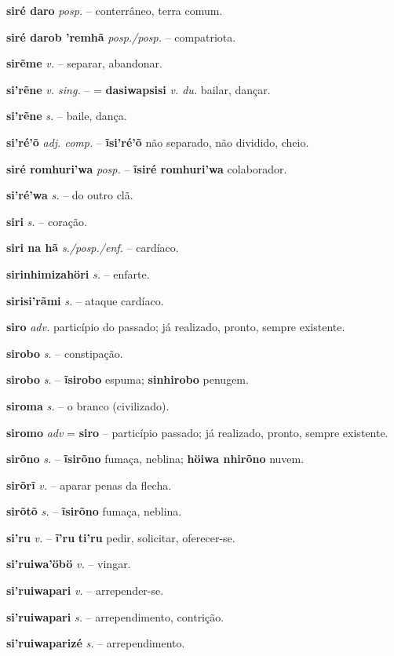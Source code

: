 \textbf{siré daro} \textit{posp.} -- conterrâneo, terra comum.

\textbf{siré darob 'remhã} \textit{posp./posp.} -- compatriota.

\textbf{sirẽme} \textit{v.} -- separar, abandonar.

\textbf{si'rẽne} \textit{v. sing.} -- = \textbf{dasiwapsisi} \textit{v. du.} bailar, dançar.

\textbf{si'rẽne} \textit{s.} -- baile, dança.

\textbf{si'ré'õ} \textit{adj. comp.} -- \textbf{ĩsi'ré'õ} não separado, não dividido, cheio.

\textbf{siré romhuri'wa} \textit{posp.} -- \textbf{ĩsiré romhuri'wa} colaborador.

\textbf{si'ré'wa} \textit{s.} -- do outro clã.

\textbf{siri} \textit{s.} -- coração.

\textbf{siri na hã} \textit{s./posp./enf.} -- cardíaco.

\textbf{sirinhimizahöri} \textit{s.} -- enfarte.

\textbf{sirisi'rãmi} \textit{s.} -- ataque cardíaco.

\textbf{siro} \textit{adv.} particípio do passado; já realizado, pronto, sempre existente.

\textbf{sirobo} \textit{s.} -- constipação.

\textbf{sirobo} \textit{s.} -- \textbf{ĩsirobo} espuma; \textbf{sinhirobo} penugem.

\textbf{siroma} \textit{s.} -- o branco (civilizado).

\textbf{siromo} \textit{adv} = \textbf{siro} -- particípio passado; já realizado, pronto, sempre existente.

\textbf{sirõno} \textit{s.} -- \textbf{ĩsirõno} fumaça, neblina; \textbf{höiwa nhirõno} nuvem.

\textbf{sirõrĩ} \textit{v.} -- aparar penas da flecha.

\textbf{sirõtõ} \textit{s.} -- \textbf{ĩsirõno} fumaça, neblina.

\textbf{si'ru} \textit{v.} -- \textbf{ĩ'ru} \textbf{ti'ru} pedir, solicitar, oferecer-se.

\textbf{si'ruiwa'öbö} \textit{v.} -- vingar.

\textbf{si'ruiwapari} \textit{v.} -- arrepender-se.

\textbf{si'ruiwapari} \textit{s.} -- arrependimento, contrição.

\textbf{si'ruiwaparizé} \textit{s.} -- arrependimento.

